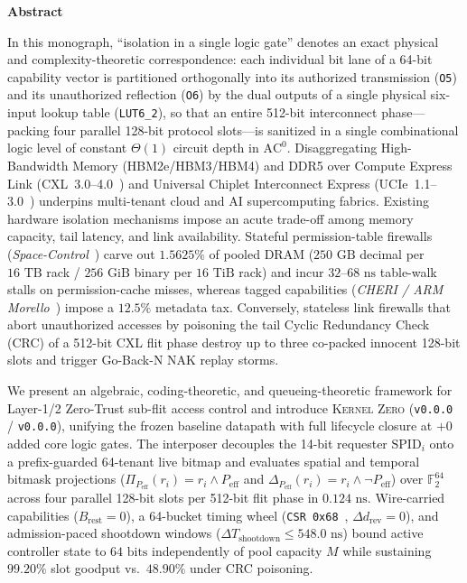 \documentclass[11pt,letterpaper]{article}
\renewenvironment{abstract}{%
  \par\vspace{-3pt}%
  \begingroup
  \leftskip=0.016\textwidth
  \rightskip=0.016\textwidth
  \noindent{\color{black!55}\hrule height 0.4pt}\vspace{1.8pt}%
  \centerline{\bfseries\small Abstract}\vspace{0.8pt}%
  \fontsize{7.95}{9.15}\selectfont
  \setlength{\parskip}{1.35pt}%
  \setlength{\parindent}{0pt}%
}{%
  \par\vspace{1.8pt}\noindent{\color{black!55}\hrule height 0.4pt}%
  \par\endgroup
  \vspace{-2pt}%
}
\providecommand{\StageOneNs}{\ensuremath{0.124\text{~ns}}}
\providecommand{\StageOneSieveDelayNs}{\StageOneNs}
\theoremstyle{spectralthm}
\begin{document}
\vspace{-0.15em}
\begin{abstract}
In this monograph, ``isolation in a single logic gate'' denotes an exact physical and complexity-theoretic correspondence: each individual bit lane of a 64-bit capability vector is partitioned orthogonally into its authorized transmission (\texttt{O5}) and its unauthorized reflection (\texttt{O6}) by the dual outputs of a single physical six-input lookup table (\texttt{LUT6\_2}), so that an entire 512-bit interconnect phase---packing four parallel 128-bit protocol slots---is sanitized in a single combinational logic level of constant $\Theta(1)$ circuit depth in $\mathrm{AC}^0$. Disaggregating High-Bandwidth Memory (HBM2e/HBM3/HBM4) and DDR5 over Compute Express Link (\mbox{CXL~3.0--4.0}~\cite{cxl2025spec, dassharma2024cxl}) and Universal Chiplet Interconnect Express (\mbox{UCIe~1.1--3.0}~\cite{ucie2025spec30}) underpins multi-tenant cloud and AI supercomputing fabrics. Existing hardware isolation mechanisms impose an acute trade-off among memory capacity, tail latency, and link availability. Stateful permission-table firewalls (\textit{Space-Control}~\cite{goswami2026spacecontrol}) carve out $1.5625\%$ of pooled DRAM ($250\text{~GB}$ decimal per $16\text{~TB}$ rack / $256\text{~GiB}$ binary per $16\text{~TiB}$ rack) and incur $32$--$68\text{~ns}$ table-walk stalls on permission-cache misses, whereas tagged capabilities (\textit{CHERI / ARM Morello}~\cite{woodruff2014cheri, watson2015cheri}) impose a $12.5\%$ metadata tax. Conversely, stateless link firewalls that abort unauthorized accesses by poisoning the tail Cyclic Redundancy Check (CRC) of a 512-bit CXL flit phase destroy up to three co-packed innocent 128-bit slots and trigger Go-Back-N NAK replay storms.

We present an algebraic, coding-theoretic, and queueing-theoretic framework for Layer-1/2 Zero-Trust sub-flit access control and introduce \textsc{Kernel Zero} (\texttt{v0.0.0} / \texttt{v0.0.0}), unifying the frozen baseline datapath with full lifecycle closure at $+0$ added core logic gates. The interposer decouples the 14-bit requester $\mathrm{SPID}_i$ onto a prefix-guarded 64-tenant live bitmap and evaluates spatial and temporal bitmask projections ($\Pi_{P_{\mathrm{eff}}}(r_i) = r_i \wedge P_{\mathrm{eff}}$ and $\Delta_{P_{\mathrm{eff}}}(r_i) = r_i \wedge \neg P_{\mathrm{eff}}$) over $\mathbb{F}_2^{64}$ across four parallel 128-bit slots per 512-bit flit phase in \StageOneSieveDelayNs. Wire-carried capabilities ($B_{\mathrm{rest}}=0$), a 64-bucket timing wheel (\texttt{CSR 0x68}~\cite{varghese1997timing}, $\Delta d_{\mathrm{rev}}=0$), and admission-paced shootdown windows ($\Delta T_{\mathrm{shootdown}} \le 548.0\text{~ns}$) bound active controller state to $64\text{~bits}$ independently of pool capacity $M$ while sustaining $99.20\%$ slot goodput vs.\ $48.90\%$ under CRC poisoning.


\end{abstract}
\end{document}
